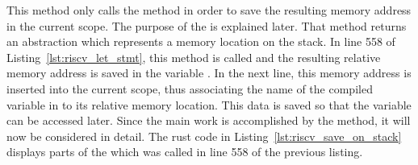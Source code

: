 
This method only calls the  method in order to save the resulting memory address in the current scope.
The purpose of the  is explained later.
That method returns an abstraction which represents a memory location on the stack.
In line 558 of Listing~\ref{lst:riscv_let_stmt}, this method is called and the resulting relative memory address is saved in the variable .
In the next line, this memory address is inserted into the current scope,
thus associating the name of the compiled variable in to its relative memory location.
This data is saved so that the variable can be accessed later.
Since the main work is accomplished by the  method, it will now be considered in detail.
The rust code in Listing~\ref{lst:riscv_save_on_stack} displays parts of the  which was called in line 558 of the previous listing.


